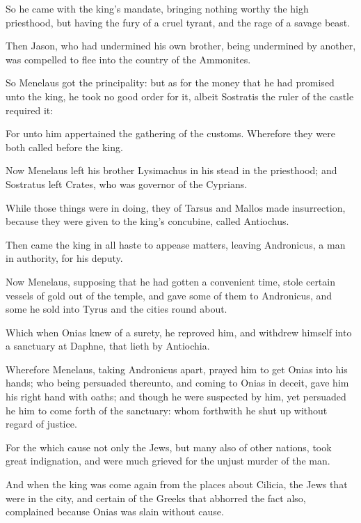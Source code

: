 {\par }{\PP {}So he came with the king’s mandate, bringing nothing worthy the high priesthood, but having the fury of a cruel tyrant, and the rage of a savage beast.
\par }{\PP {}Then Jason, who had undermined his own brother, being undermined by another, was compelled to flee into the country of the Ammonites.
\par }{\PP {}So Menelaus got the principality: but as for the money that he had promised unto the king, he took no good order for it, albeit Sostratis the ruler of the castle required it:
\par }{\PP {}For unto him appertained the gathering of the customs. Wherefore they were both called before the king.
\par }{\PP {}Now Menelaus left his brother Lysimachus in his stead in the priesthood; and Sostratus left Crates, who was governor of the Cyprians.
\par }{\PP {}While those things were in doing, they of Tarsus and Mallos made insurrection, because they were given to the king’s concubine, called Antiochus.
\par }{\PP {}Then came the king in all haste to appease matters, leaving Andronicus, a man in authority, for his deputy.
\par }{\PP {}Now Menelaus, supposing that he had gotten a convenient time, stole certain vessels of gold out of the temple, and gave some of them to Andronicus, and some he sold into Tyrus and the cities round about.
\par }{\PP {}Which when Onias knew of a surety, he reproved him, and withdrew himself into a sanctuary at Daphne, that lieth by Antiochia.
\par }{\PP {}Wherefore Menelaus, taking Andronicus apart, prayed him to get Onias into his hands; who being persuaded thereunto, and coming to Onias in deceit, gave him his right hand with oaths; and though he were suspected by him, yet persuaded he him to come forth of the sanctuary: whom forthwith he shut up without regard of justice.
\par }{\PP {}For the which cause not only the Jews, but many also of other nations, took great indignation, and were much grieved for the unjust murder of the man.
\par }{\PP {}And when the king was come again from the places about Cilicia, the Jews that were in the city, and certain of the Greeks that abhorred the fact also, complained because Onias was slain without cause.
}
